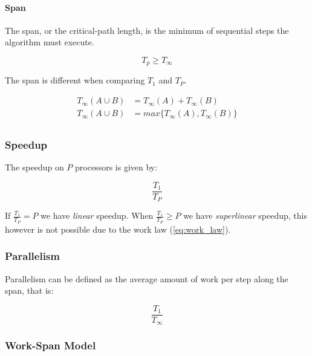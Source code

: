 \paragraph{Span}

The span, or the critical-path length, is the minimum of sequential steps the algorithm must execute.

\begin{equation}\label{eq:span_law}
    T_p \ge T_{\infty}
\end{equation}

The span is different when comparing $T_1$ and $T_P$.

\begin{equation}
    \begin{split}
        T_{\infty} (A \cup B) & = T_{\infty}(A) + T_{\infty}(B)\\
        T_{\infty} (A \cup B) & = max\{T_{\infty}(A), T_{\infty}(B)\}\\
    \end{split}
\end{equation}

\subsubsection{Speedup}

The speedup on $P$ processors is given by:

\begin{equation}
    \frac{T_1}{T_P}
\end{equation}

If $\frac{T_1}{T_P} = P$ we have \textit{linear} speedup.
When $\frac{T_1}{T_P} \ge P$ we have \textit{superlinear} speedup,
this however is not possible due to the work law (\autoref{eq:work_law}).

\subsubsection{Parallelism}

Parallelism can be defined as the average amount of work per step along the span, that is:

\begin{equation}
    \frac{T_1}{T_\infty}
\end{equation}

\subsubsection{Work-Span Model}

